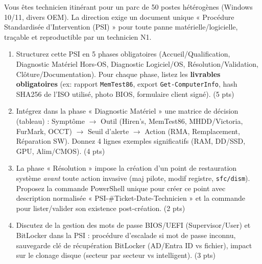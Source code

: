 \documentclass[11pt]{article}
\begin{document}
\begin{exercice}
Vous êtes technicien itinérant pour un parc de 50 postes hétérogènes (Windows 10/11, divers OEM). La direction exige un document unique « Procédure Standardisée d'Intervention (PSI) » pour toute panne matérielle/logicielle, traçable et reproductible par un technicien N1.

\begin{enumerate}
    \item Structurez cette PSI en 5 phases obligatoires (Accueil/Qualification, Diagnostic Matériel Hors-OS, Diagnostic Logiciel/OS, Résolution/Validation, Clôture/Documentation). Pour chaque phase, listez les \textbf{livrables obligatoires} (ex: rapport \texttt{MemTest86}, export \texttt{Get-ComputerInfo}, hash SHA256 de l'ISO utilisé, photo BIOS, formulaire client signé). (5 pts)
    \item Intégrez dans la phase « Diagnostic Matériel » une matrice de décision (tableau) : Symptôme $\to$ Outil (Hiren's, MemTest86, MHDD/Victoria, FurMark, OCCT) $\to$ Seuil d'alerte $\to$ Action (RMA, Remplacement, Réparation SW). Donnez 4 lignes exemples significatifs (RAM, DD/SSD, GPU, Alim/CMOS). (4 pts)
    \item La phase « Résolution » impose la création d'un point de restauration système \textit{avant} toute action invasive (maj pilote, modif registre, \texttt{sfc/dism}). Proposez la commande PowerShell unique pour créer ce point avec description normalisée « PSI-\#Ticket-Date-Technicien » et la commande pour lister/valider son existence post-création. (2 pts)
    \item Discutez de la gestion des mots de passe BIOS/UEFI (Supervisor/User) et BitLocker dans la PSI : procédure d'escalade si mot de passe inconnu, sauvegarde clé de récupération BitLocker (AD/Entra ID vs fichier), impact sur le clonage disque (secteur par secteur vs intelligent). (3 pts)
\end{enumerate}
\end{exercice}
\end{document}
